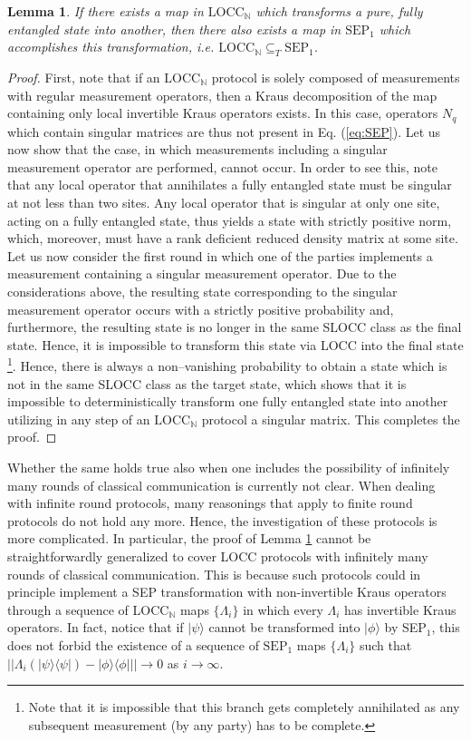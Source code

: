 \documentclass[superscriptaddress,twocolumn]{revtex4}\usepackage[utf8]{inputenc}
\newtheorem{lemma}[theorem]{Lemma}
\newcommand{\N}{\mathbb{N}}
\begin{document}
\begin{lemma}
\label{lemma:LOCCNinSEP1}
If there exists a map in $\textrm{LOCC}_\N$ which transforms a pure, fully entangled state into another, then there also exists a map in $\textrm{SEP}_1$ which accomplishes this transformation, i.e. $\textrm{LOCC}_\N\subseteq_T \textrm{SEP}_1$.
\end{lemma}
\begin{proof}
First, note that if an $\textrm{LOCC}_\N$ protocol is solely composed of measurements with regular measurement operators, then a Kraus decomposition of the map containing only local invertible Kraus operators exists. In this case, operators $N_q$ which contain singular matrices are thus not present in Eq. (\ref{eq:SEP}). Let us now show that the case, in which measurements including a singular measurement operator are performed, cannot occur. In order to see this, note that any local operator that annihilates a fully entangled state must be singular at not less than two sites. Any local operator that is singular at only one site, acting on a fully entangled state, thus yields a state with strictly positive norm, which, moreover, must have a rank deficient reduced density matrix at some site.
Let us now consider the first round in which one of the parties implements a measurement containing a singular measurement operator. Due to the considerations above, the resulting state corresponding to the singular measurement operator occurs with a strictly positive probability and, furthermore, the resulting state is no longer in the same SLOCC class as the final state. Hence, it is impossible to transform this state via LOCC into the final state \footnote{Note that it is impossible that this branch gets completely annihilated as any subsequent measurement (by any party) has to be complete. }. Hence, there is always a non--vanishing probability to obtain a state which is not in the same SLOCC class as the target state, which shows that it is impossible to deterministically transform one fully entangled state into another utilizing in any step of an $\textrm{LOCC}_\N$ protocol a singular matrix. This completes the proof.
\end{proof}

Whether the same holds true also when one includes the possibility of infinitely many rounds of classical communication is currently not clear. When dealing with infinite round protocols, many reasonings that apply to finite round protocols do not hold any more. Hence, the investigation of these protocols is more complicated.
In particular, the proof of Lemma \ref{lemma:LOCCNinSEP1} cannot be straightforwardly generalized to cover LOCC protocols with infinitely many rounds of classical communication. This is because such protocols could in principle implement a SEP transformation with non-invertible Kraus operators through a sequence of LOCC$_\mathbb{N}$ maps $\{\Lambda_i\}$ in which every $\Lambda_i$ has invertible Kraus operators. In fact, notice that if $|\psi\rangle$ cannot be transformed into $|\phi\rangle$ by SEP$_1$, this does not forbid the existence of a sequence of $\textrm{SEP}_1$ maps $\{\Lambda_i\}$ such that $||\Lambda_i(|\psi\rangle\langle\psi|)- |\phi\rangle\langle\phi|||\to 0$ as $i\to\infty$.
\end{document}
